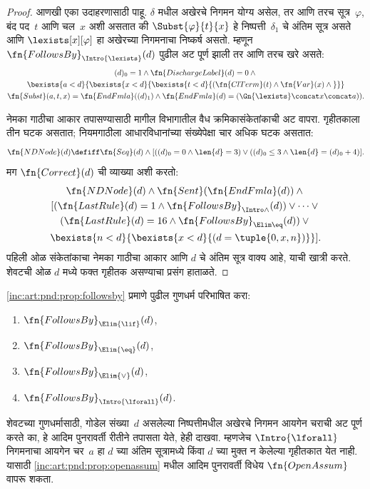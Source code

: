 \begin{proof}
  आणखी एका उदाहरणासाठी \Intro{\lexists} पाहू. $\delta$ मधील
  अखेरचे निगमन योग्य असेल, तर आणि तरच सूत्र~$\varphi$,
  बंद पद~$t$ आणि चल~$x$ अशी असतात की
  $\Subst{\varphi}{t}{x}$ हे निष्पत्ती~$\delta_1$ चे अंतिम
  सूत्र असते आणि $\lexists[x][\varphi]$ हा अखेरच्या निगमनाचा
  निष्कर्ष असतो. म्हणून $\fn{FollowsBy}_{\Intro{\lexists}}(d)$
  पुढील अट पूर्ण झाली तर आणि तरच खरे असते:
  \begin{multline*}
    (d)_0 = 1 \land \fn{DischargeLabel}(d) = 0 \land {} \\
    \bexists{a < d}{\bexists{x<d}{\bexists{t<d}{
          (\fn{ClTerm}(t) \land \fn{Var}(x)  \land {}}}}\\
    \fn{Subst}(a,t,x) = \fn{EndFmla}((d)_1) \land
    \fn{EndFmla}(d) = (\Gn{\lexists} \concat x \concat a)).
  \end{multline*}

नेमका गाठीचा आकार तपासण्यासाठी मागील विभागातील वैध क्रमिकासंकेतांकाची
अट वापरा. गृहीतकाला तीन घटक असतात; नियमगाठीला आधारविधानांच्या
संख्येपेक्षा चार अधिक घटक असतात:
\[\fn{NDNode}(d) \defiff \fn{Seq}(d) \land
[((d)_0=0 \land \len{d}=3) \lor ((d)_0\le3 \land \len{d}=(d)_0+4)].
\]
  मग $\fn{Correct}(d)$ ची व्याख्या अशी करतो:
  \begin{multline*}
    \fn{NDNode}(d) \land \fn{Sent}(\fn{EndFmla}(d)) \land {}\\
    [(\fn{LastRule}(d) = 1 \land
    \fn{FollowsBy}_{\Intro\land}(d)) \lor \dots \lor {}\\
    (\fn{LastRule}(d) = 16 \land \fn{FollowsBy}_{\Elim\eq}(d)) \lor {}\\
    \bexists{n<d}{\bexists{x<d}{(d = \tuple{0, x, n})}}].
  \end{multline*}
  पहिली ओळ संकेतांकाचा नेमका गाठीचा आकार आणि $d$ चे अंतिम सूत्र वाक्य आहे, याची खात्री
  करते. शेवटची ओळ $d$ मध्ये फक्त गृहीतक असण्याचा प्रसंग हाताळते.
\end{proof}

\begin{prob}
  \ref{inc:art:pnd:prop:followsby} प्रमाणे पुढील गुणधर्म
  परिभाषित करा:
  \begin{enumerate}
  \item $\fn{FollowsBy}_{\Elim{\lif}}(d)$,
  \item $\fn{FollowsBy}_{\Elim{\eq}}(d)$,
  \item $\fn{FollowsBy}_{\Elim{\lor}}(d)$,
  \item $\fn{FollowsBy}_{\Intro{\lforall}}(d)$.
  \end{enumerate}
  शेवटच्या गुणधर्मासाठी, गोडेल संख्या~$d$ असलेल्या
  निष्पत्तीमधील अखेरचे निगमन आयगेन चराची अट पूर्ण करते
  का, हे आदिम पुनरावर्ती रीतीने तपासता येते, हेही दाखवा.
  म्हणजेच $\Intro{\lforall}$ निगमनाचा आयगेन चर~$a$ हा
  $d$ च्या अंतिम सूत्रामध्ये किंवा $d$ च्या मुक्त न केलेल्या
  गृहीतकात येत नाही. यासाठी
  \ref{inc:art:pnd:prop:openassum} मधील आदिम पुनरावर्ती
  विधेय $\fn{OpenAssum}$ वापरू शकता.
\end{prob}

